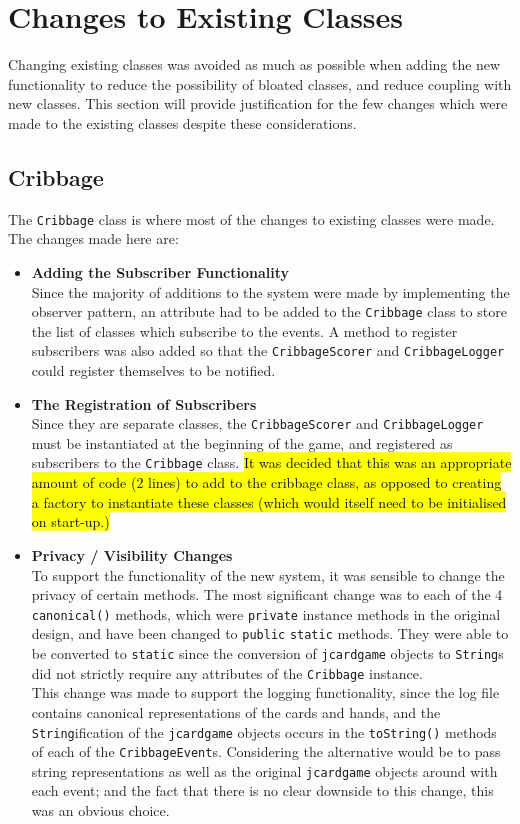 \documentclass{article}
\begin{document}
\section{Changes to Existing Classes}
Changing existing classes was avoided as much as possible when adding the new functionality to reduce the possibility of bloated classes, and reduce coupling with new classes. This section will provide justification for the few changes which were made to the existing classes despite these considerations.
\subsection{Cribbage}
The \verb|Cribbage| class is where most of the changes to existing classes were made. The changes made here are:
\begin{itemize}
    \item \textbf{Adding the Subscriber Functionality}\\[2mm]
    Since the majority of additions to the system were made by implementing the observer pattern, an attribute had to be added to the \verb|Cribbage| class to store the list of classes which subscribe to the events. A method to register subscribers was also added so that the \verb|CribbageScorer| and \verb|CribbageLogger| could register themselves to be notified.
    \item \textbf{The Registration of Subscribers}\\[2mm]
    Since they are separate classes, the \verb|CribbageScorer| and \verb|CribbageLogger| must be instantiated at the beginning of the game, and registered as subscribers to the \verb|Cribbage| class. \hl{It was decided that this was an appropriate amount of code (2 lines) to add to the cribbage class, as opposed to creating a factory to instantiate these classes (which would itself need to be initialised on start-up.)}
    \item \textbf{Privacy / Visibility Changes}\\[2mm] 
    To support the functionality of the new system, it was sensible to change the privacy of certain methods. The most significant change was to each of the 4 \verb|canonical()| methods, which were \verb|private| instance methods in the original design, and have been changed to \verb|public| \verb|static| methods. They were able to be converted to \verb|static| since the conversion of \verb|jcardgame| objects to \verb|String|s did not strictly require any attributes of the \verb|Cribbage| instance.\\[2mm]
    This change was made to support the logging functionality, since the log file contains canonical representations of the cards and hands, and the \verb|String|ification of the \verb|jcardgame| objects occurs in the \verb|toString()| methods of each of the \verb|CribbageEvent|s. Considering the alternative would be to pass string representations as well as the original \verb|jcardgame| objects around with each event; and the fact that there is no clear downside to this change, this was an obvious choice.
\end{itemize}

% 
\end{document}

